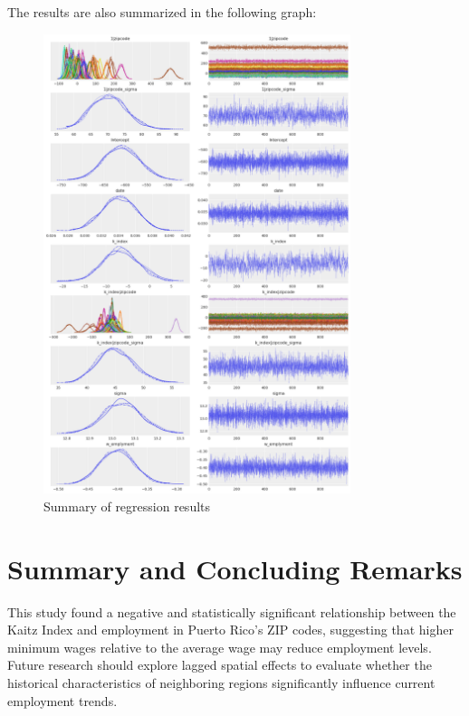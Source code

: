 \documentclass[AEJ]{AEA}
\begin{document}
The results are also summarized in the following graph:

\begin{figure}[htbp]
	\centering
	\includegraphics[width=0.8\textwidth]{results.png}
	\caption{Summary of regression results}
\end{figure}

\section{Summary and Concluding Remarks}

This study found a negative and statistically significant relationship between the Kaitz Index and employment in Puerto Rico's ZIP codes, suggesting that higher minimum wages relative to the average wage may reduce employment levels. Future research should explore lagged spatial effects to evaluate whether the historical characteristics of neighboring regions significantly influence current employment trends.
\end{document}
